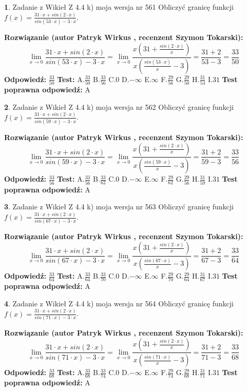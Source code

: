 \documentclass[12pt, a4paper]{article}
\theoremstyle{definition} %
\newtheorem{zad}{}
\newcommand{\zadStart}[1]{\begin{zad}#1\newline}
\newcommand{\zadStop}{\end{zad}}
\newcommand{\rozwStart}[2]{\noindent \textbf{Rozwiązanie (autor #1 , recenzent #2): }\newline}
\newcommand{\rozwStop}{\newline}
\newcommand{\odpStart}{\noindent \textbf{Odpowiedź:}\newline}
\newcommand{\odpStop}{\newline}
\newcommand{\testStart}{\noindent \textbf{Test:}\newline}
\newcommand{\testStop}{\newline}
\newcommand{\kluczStart}{\noindent \textbf{Test poprawna odpowiedź:}\newline}
\newcommand{\kluczStop}{\newline}
\begin{document}
\zadStart{Zadanie z Wikieł Z 4.4 k) moja wersja nr 561}
Obliczyć granicę funkcji $f(x)=\frac{31\cdot x +sin(2\cdot x)}{sin(53\cdot x) -3\cdot x}$.
\zadStop
\rozwStart{Patryk Wirkus}{Szymon Tokarski}
$$\lim\limits_{x\to 0}\frac{31\cdot x +sin(2\cdot x)}{sin(53\cdot x) -3\cdot x}
=\lim\limits_{x\to 0}\frac{x(31+\frac{sin(2\cdot x)}{x})}{x(\frac{sin(53\cdot x)}{x}-3)}
=\frac{31+2}{53-3} = \frac{33}{50}$$
\rozwStop
\odpStart
$\frac{33}{50}$
\odpStop
\testStart
A.$\frac{33}{50}$
B.$\frac{33}{56}$
C.$0$
D.$-\infty$
E.$\infty$
F.$\frac{29}{56}$
G.$\frac{29}{50}$
H.$\frac{31}{53}$
I.$31$
\testStop
\kluczStart
A
\kluczStop



\zadStart{Zadanie z Wikieł Z 4.4 k) moja wersja nr 562}
Obliczyć granicę funkcji $f(x)=\frac{31\cdot x +sin(2\cdot x)}{sin(59\cdot x) -3\cdot x}$.
\zadStop
\rozwStart{Patryk Wirkus}{Szymon Tokarski}
$$\lim\limits_{x\to 0}\frac{31\cdot x +sin(2\cdot x)}{sin(59\cdot x) -3\cdot x}
=\lim\limits_{x\to 0}\frac{x(31+\frac{sin(2\cdot x)}{x})}{x(\frac{sin(59\cdot x)}{x}-3)}
=\frac{31+2}{59-3} = \frac{33}{56}$$
\rozwStop
\odpStart
$\frac{33}{56}$
\odpStop
\testStart
A.$\frac{33}{56}$
B.$\frac{33}{62}$
C.$0$
D.$-\infty$
E.$\infty$
F.$\frac{29}{62}$
G.$\frac{29}{56}$
H.$\frac{31}{59}$
I.$31$
\testStop
\kluczStart
A
\kluczStop



\zadStart{Zadanie z Wikieł Z 4.4 k) moja wersja nr 563}
Obliczyć granicę funkcji $f(x)=\frac{31\cdot x +sin(2\cdot x)}{sin(67\cdot x) -3\cdot x}$.
\zadStop
\rozwStart{Patryk Wirkus}{Szymon Tokarski}
$$\lim\limits_{x\to 0}\frac{31\cdot x +sin(2\cdot x)}{sin(67\cdot x) -3\cdot x}
=\lim\limits_{x\to 0}\frac{x(31+\frac{sin(2\cdot x)}{x})}{x(\frac{sin(67\cdot x)}{x}-3)}
=\frac{31+2}{67-3} = \frac{33}{64}$$
\rozwStop
\odpStart
$\frac{33}{64}$
\odpStop
\testStart
A.$\frac{33}{64}$
B.$\frac{33}{70}$
C.$0$
D.$-\infty$
E.$\infty$
F.$\frac{29}{70}$
G.$\frac{29}{64}$
H.$\frac{31}{67}$
I.$31$
\testStop
\kluczStart
A
\kluczStop



\zadStart{Zadanie z Wikieł Z 4.4 k) moja wersja nr 564}
Obliczyć granicę funkcji $f(x)=\frac{31\cdot x +sin(2\cdot x)}{sin(71\cdot x) -3\cdot x}$.
\zadStop
\rozwStart{Patryk Wirkus}{Szymon Tokarski}
$$\lim\limits_{x\to 0}\frac{31\cdot x +sin(2\cdot x)}{sin(71\cdot x) -3\cdot x}
=\lim\limits_{x\to 0}\frac{x(31+\frac{sin(2\cdot x)}{x})}{x(\frac{sin(71\cdot x)}{x}-3)}
=\frac{31+2}{71-3} = \frac{33}{68}$$
\rozwStop
\odpStart
$\frac{33}{68}$
\odpStop
\testStart
A.$\frac{33}{68}$
B.$\frac{33}{74}$
C.$0$
D.$-\infty$
E.$\infty$
F.$\frac{29}{74}$
G.$\frac{29}{68}$
H.$\frac{31}{71}$
I.$31$
\testStop
\kluczStart
A
\kluczStop
\end{document}
